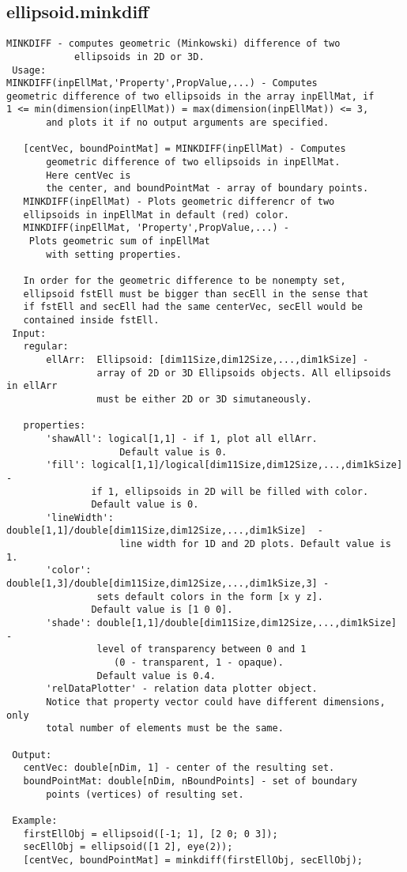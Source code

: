 \subsection{\texorpdfstring{ellipsoid.minkdiff}{minkdiff}}\label{method:ellipsoid.minkdiff}
\begin{verbatim}
MINKDIFF - computes geometric (Minkowski) difference of two
            ellipsoids in 2D or 3D.
 Usage:
MINKDIFF(inpEllMat,'Property',PropValue,...) - Computes
geometric difference of two ellipsoids in the array inpEllMat, if
1 <= min(dimension(inpEllMat)) = max(dimension(inpEllMat)) <= 3,
       and plots it if no output arguments are specified.

   [centVec, boundPointMat] = MINKDIFF(inpEllMat) - Computes
       geometric difference of two ellipsoids in inpEllMat.
       Here centVec is
       the center, and boundPointMat - array of boundary points.
   MINKDIFF(inpEllMat) - Plots geometric differencr of two
   ellipsoids in inpEllMat in default (red) color.
   MINKDIFF(inpEllMat, 'Property',PropValue,...) -
    Plots geometric sum of inpEllMat
       with setting properties.

   In order for the geometric difference to be nonempty set,
   ellipsoid fstEll must be bigger than secEll in the sense that
   if fstEll and secEll had the same centerVec, secEll would be
   contained inside fstEll.
 Input:
   regular:
       ellArr:  Ellipsoid: [dim11Size,dim12Size,...,dim1kSize] -
                array of 2D or 3D Ellipsoids objects. All ellipsoids in ellArr
                must be either 2D or 3D simutaneously.

   properties:
       'shawAll': logical[1,1] - if 1, plot all ellArr.
                    Default value is 0.
       'fill': logical[1,1]/logical[dim11Size,dim12Size,...,dim1kSize]  -
               if 1, ellipsoids in 2D will be filled with color.
               Default value is 0.
       'lineWidth': double[1,1]/double[dim11Size,dim12Size,...,dim1kSize]  -
                    line width for 1D and 2D plots. Default value is 1.
       'color': double[1,3]/double[dim11Size,dim12Size,...,dim1kSize,3] -
                sets default colors in the form [x y z].
               Default value is [1 0 0].
       'shade': double[1,1]/double[dim11Size,dim12Size,...,dim1kSize]  -
                level of transparency between 0 and 1
                   (0 - transparent, 1 - opaque).
                Default value is 0.4.
       'relDataPlotter' - relation data plotter object.
       Notice that property vector could have different dimensions, only
       total number of elements must be the same.

 Output:
   centVec: double[nDim, 1] - center of the resulting set.
   boundPointMat: double[nDim, nBoundPoints] - set of boundary
       points (vertices) of resulting set.

 Example:
   firstEllObj = ellipsoid([-1; 1], [2 0; 0 3]);
   secEllObj = ellipsoid([1 2], eye(2));
   [centVec, boundPointMat] = minkdiff(firstEllObj, secEllObj);
\end{verbatim}

